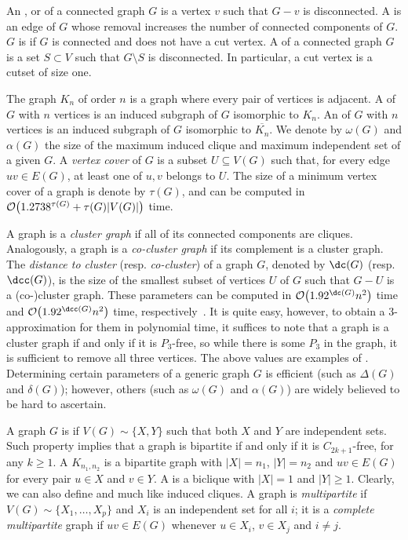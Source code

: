 An ,  or  of a connected graph $G$ is a vertex $v$ such that $G - v$ is disconnected.
A  is an edge of $G$ whose removal increases the number of connected components of $G$.
$G$ is  if $G$ is connected and does not have a cut vertex.
A  of a connected graph $G$ is a set $S \subset V$ such that $G \setminus S$ is disconnected.
In particular, a cut vertex is a cutset of size one.

The  graph $K_n$ of order $n$ is a graph where every pair of vertices is adjacent.
A  of $G$ with $n$ vertices is an induced subgraph of $G$ isomorphic to $K_n$.
An  of $G$ with $n$ vertices is an induced subgraph of $G$ isomorphic to $\overline{K_n}$.
We denote by $\omega(G)$ and $\alpha(G)$ the size of the maximum induced clique and maximum independent set of a given $G$.
A \textit{vertex cover} of $G$ is a subset $U \subseteq V(G)$ such that, for every edge $uv \in E(G)$, at least one of $u,v$ belongs to $U$.
The size of a minimum vertex cover of a graph is denote by $\tau(G)$, and can be computed in $\mathcal{O}\!\left(1.2738^{\tau(G)} + \tau(G)|V(G)|\right)$ time.

A graph is a \textit{cluster graph} if all of its connected components are cliques.
Analogously, a graph is a \textit{co-cluster graph} if its complement is a cluster graph.
The \textit{distance to cluster} (resp. \textit{co-cluster}) of a graph $G$, denoted by $\dc(G)$ (resp. $\dcc(G)$), is the size of the smallest subset of vertices $U$ of $G$ such that $G - U$ is a (co-)cluster graph.
These parameters can be computed in $\bigO{1.92^{\dc( G )}n^2 }$
time and $\bigO{1.92^{\dcc( G )}n^2 }$ time, respectively~\citep{branching-cluster}.
It is quite easy, however, to obtain a 3-approximation for them in polynomial time, it suffices to note that a graph is a cluster graph if and only if it is $P_3$-free, so while there is some $P_3$ in the graph, it is sufficient to remove all three vertices.
The above values are examples of .
Determining certain parameters of a generic graph $G$ is efficient (such as $\Delta(G)$ and $\delta(G)$); however, others (such as $\omega(G)$ and $\alpha(G)$) are widely believed to be hard to ascertain.

A graph $G$ is  if $V(G) \sim \{X, Y\}$ such that both $X$ and $Y$ are independent sets.
Such property implies that a graph is bipartite if and only if it is $C_{2k+1}$-free, for any $k \geq 1$.
A  $K_{n_1,n_2}$ is a bipartite graph with $|X| = n_1$, $|Y| = n_2$ and $uv \in E(G)$ for every pair $u \in X$ and $v \in Y$.
A  is a biclique with $|X| = 1$ and $|Y| \geq 1$.
Clearly, we can also define  and  much like induced cliques.
A graph is \textit{multipartite} if $V(G) \sim \{X_1, \dots,  X_p\}$ and $X_i$ is an independent set for all $i$; it is a \textit{complete multipartite} graph if $uv \in E(G)$ whenever $u \in X_i$, $v \in X_j$ and $i \neq j$.

